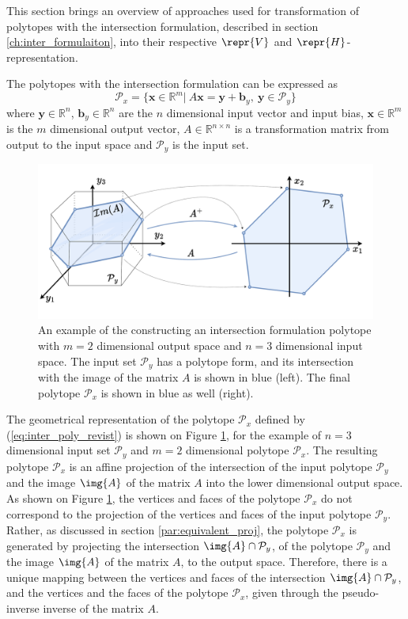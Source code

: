 This section brings an overview of approaches used for transformation of polytopes with the intersection formulation, described in section \ref{ch:inter_formulaiton}, into their respective $\repr{V}$ and $\repr{H}$-representation. 

The polytopes with the intersection formulation can be expressed as
\begin{equation}
    \mathcal{P}_x=\{\bm{x}\in\mathbb{R}^m |~ A\bm{x} = \bm{y} + \bm{b}_y,~\bm{y} \in \mathcal{P}_y  \}
    \label{eq:inter_poly_revist}
\end{equation}
where $\bm{y}\in\mathbb{R}^n$, $\bm{b}_y\in\mathbb{R}^n$ are the $n$ dimensional input vector and input bias, $\bm{x}\in\mathbb{R}^m$ is the $m$ dimensional output vector, $A\in\mathbb{R}^{n\times n}$ is a transformation matrix from output to the input space and $\mathcal{P}_y$ is the input set.

\label{ch:inter_poly_chapter}
\begin{figure}[h]
    \centering
    \includegraphics[width=0.8\linewidth]{Chapters/imgs/inter_poly.pdf}
    \caption{An example of the constructing an intersection formulation polytope with $m=2$ dimensional output space and $n=3$ dimensional input space. The input set $\mathcal{P}_y$ has a polytope form, and its intersection with the image of the matrix $A$ is shown in blue (left). The final polytope $\mathcal{P}_x$ is shown in blue as well (right).}
    \label{fig:inter_poly}
\end{figure}

The geometrical representation of the polytope $\mathcal{P}_x$ defined by (\ref{eq:inter_poly_revist}) is shown on Figure \ref{fig:inter_poly}, for the example of $n=3$ dimensional input set $\mathcal{P}_y$ and $m=2$ dimensional polytope $\mathcal{P}_x$. 
The resulting polytope $\mathcal{P}_x$ is an affine projection of the intersection of the input polytope $\mathcal{P}_y$ and the image $\img{A}$ of the matrix $A$ into the lower dimensional output space. As shown on Figure \ref{fig:inter_poly}, the vertices and faces of the polytope $\mathcal{P}_x$ do not correspond to the projection of the vertices and faces of the input polytope $\mathcal{P}_y$. 
Rather, as discussed in section \ref{par:equivalent_proj}, the polytope $\mathcal{P}_x$ is generated by projecting the intersection $\img{A}\cap\mathcal{P}_y$, of the polytope $\mathcal{P}_y$ and the image $\img{A}$ of the matrix $A$, to the output space. 
Therefore, there is a unique mapping between the vertices and faces of the intersection $\img{A}\cap\mathcal{P}_y$, and the vertices and the faces of the polytope $\mathcal{P}_x$, given through the pseudo-inverse inverse\cite{wang2018generalized} of the matrix $A$. 

